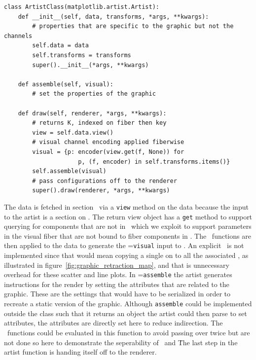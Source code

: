 \documentclass[../main.tex]{subfiles}
\begin{document}
\begin{verbatim}
class ArtistClass(matplotlib.artist.Artist):
    def __init__(self, data, transforms, *args, **kwargs):
        # properties that are specific to the graphic but not the channels
        self.data = data 
        self.transforms = transforms
        super().__init__(*args, **kwargs)

    def assemble(self, visual):
        # set the properties of the graphic

    def draw(self, renderer, *args, **kwargs):
        # returns K, indexed on fiber then key 
        view = self.data.view() 
        # visual channel encoding applied fiberwise 
        visual = {p: encoder(view.get(f, None)) for 
                     p, (f, encoder) in self.transforms.items()}
        self.assemble(visual)
        # pass configurations off to the renderer
        super().draw(renderer, *args, **kwargs)
\end{verbatim}

The data is fetched in section \dsection\ via a \texttt{view} method on the data because the input to the artist is a section on \dtotal. The return view object has a \texttt{get} method to support querying for components that are not in \dfiber\, which we exploit to support parameters in the visual fiber that are not bound to fiber components in \dfiber. The \vchannel\ functions are then applied to the data to generate the \vsection=\texttt{visual} input to \vmark. An explicit \vindex\ is not implemented since that would mean copying a single \vsection on \dbasepoint to all the associated \gbasepoint, as illustrated in figure~\ref{fig:graphic_retraction_map}, and that is unnecessary overhead for these scatter and line plots. In \vmarkd=\texttt{assemble} the artist generates instructions for the render by setting  the attributes that are related to the graphic. These are the settings that would have to be serialized in order to recreate a static version of the graphic. Although \texttt{assemble} could be implemented outside the class such that it returns an object the artist could then parse to set attributes, the attributes are directly set here to reduce indirection. The \vchannel\ functions could be evaluated in this function to avoid passing over \dbase twice but are not done so here to demonstrate the seperability of \vchannel\ and \vmarkd\. The last step in the artist function is handing itself off to the renderer. 
\end{document}
